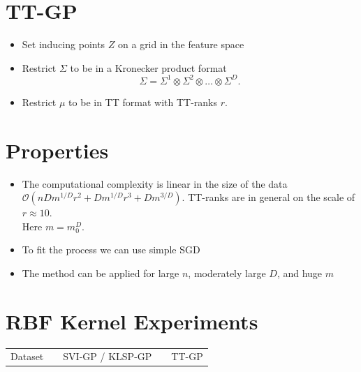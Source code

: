 \documentclass[a0,portrait]{a0poster}
\newcommand{\bigO}{\mathcal{O}}
\begin{document}
\begin{multicols}{2}
\section*{\LARGE \color{NavyBlue}TT-GP}

\begin{itemize}
  \item Set inducing points $Z$ on a grid in the feature space
  \item Restrict $\Sigma$ to be in a Kronecker product format
    \[
      \Sigma = \Sigma^1 \otimes \Sigma^2\otimes \ldots \otimes \Sigma^D.
    \]
  \item Restrict $\mu$ to be in TT format with TT-ranks $r$.
\end{itemize}

\section*{\LARGE \color{NavyBlue} Properties}
    
\begin{itemize}
  \item The computational complexity is linear in the size of the data
    $\bigO(n D m^{1 / D} r^2 + D m^{1 / D} r^3 + D m^{3 / D})$. 
    TT-ranks are in general on the scale of $r \approx 10$.\\ 
    Here $m = m_0^D$.
  \item To fit the process we can use simple SGD
  \item The method can be applied for large $n$, moderately large $D$,
    and huge $m$
\end{itemize}

\section*{\LARGE \color{NavyBlue} RBF Kernel Experiments}
\citet{hensman2013}

\begin{center}
  \begin{tabular}{lll l cll l clll}
    \toprule
    \multicolumn{3}{c}{Dataset} && \multicolumn{3}{c}{SVI-GP / KLSP-GP} && \multicolumn{4}{c}{TT-GP} \\
    \cmidrule{1-3}
    \cmidrule{5-7}
    \cmidrule{9-12}


\end{tabular}
\end{center}
\end{multicols}
\end{document}
